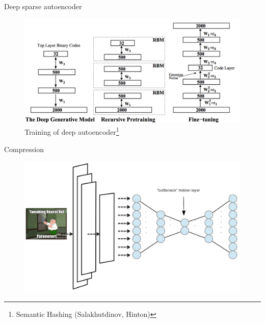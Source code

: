 \documentclass{beamer}
\begin{document}
\begin{frame}{Deep sparse autoencoder}

\begin{figure}[h!]
  \centering
  \includegraphics[width=1\textwidth]{images/dae.png}
  \caption{Training of deep autoencoder\footnote{Semantic Hashing (Salakhutdinov, Hinton)}}
\end{figure}

\end{frame}


\begin{frame}{Compression}

\begin{figure}[h!]
  \centering
  \includegraphics[width=1\textwidth]{images/vgg_transfer_sh.png}
\end{figure}

\end{frame}
\end{document}
